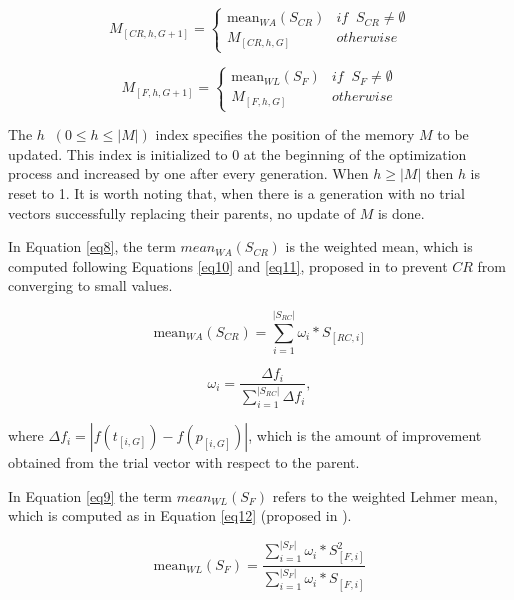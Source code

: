 \documentclass[review]{elsarticle}
\begin{document}
\begin{equation}
M_{[CR,h,G+1]} = \left\{ \begin{array}{lc}
\text{mean}_{WA} (S_{CR}) &   if \;\; S_{CR} \neq \emptyset \\
M_{[CR,h,G]} &  otherwise
\end{array}
\right.
\label{eq8}
\end{equation}

\begin{equation}
M_{[F,h,G+1]} = \left\{ \begin{array}{lc}
\text{mean}_{WL} (S_{F}) &   if \;\; S_{F} \neq \emptyset \\
M_{[F,h,G]} &  otherwise
\end{array}
\right.
\label{eq9}
\end{equation}

The $h \;\; (0 \le h \le |M|)$ index specifies the position of the memory $M$ to be updated. This index is initialized to $0$ at the beginning of the optimization process and increased by one after every generation. When $h \ge |M|$ then $h$ is reset to 1. It is worth noting that, when there is a generation with no trial vectors successfully replacing their parents, no update of $M$ is done.

In Equation \ref{eq8}, the term $mean_{WA} (S_{CR})$ is the weighted mean, which is computed following Equations \eqref{eq10} and \eqref{eq11}, proposed in \cite{peng2009multi} to prevent $CR$ from converging to small values.

\begin{equation}
\text{mean}_{WA} (S_{CR}) = \sum_{i = 1}^{|S_{RC}|} \omega_i * S_{[RC,i]}
\label{eq10}
\end{equation}

\begin{equation}
\omega_i = \frac{\Delta f_i}{\sum_{i = 1}^{|S_{RC}|} \Delta f_i},
\label{eq11}
\end{equation}

\noindent where $\Delta f_i = |f(t_{[i,G]}) - f(p_{[i, G]})|$, which is the amount of improvement obtained from the trial vector with respect to the parent.

In Equation \ref{eq9} the term $mean_{WL} (S_{F})$ refers to the weighted Lehmer mean, which is computed as in Equation \eqref{eq12} (proposed in \cite{tanabe2013success}).

\begin{equation}
\text{mean}_{WL} (S_{F}) = \frac{\sum_{i = 1}^{|S_{F}|} \omega_i * S^2_{[F,i]}}{\sum_{i = 1}^{|S_{F}|} \omega_i * S_{[F,i]}}
\label{eq12}
\end{equation}
\end{document}
